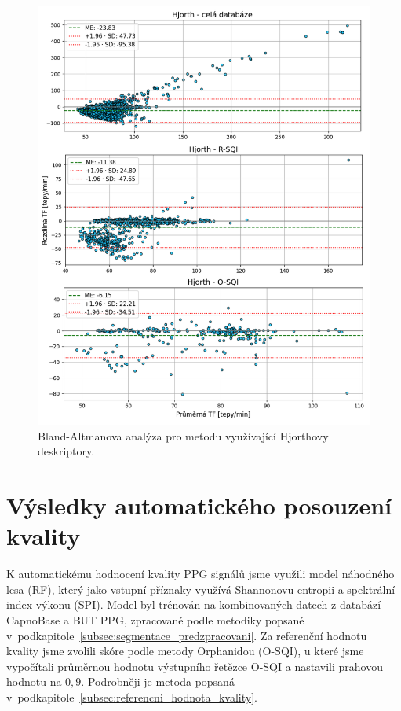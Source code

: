 \begin{figure}[!ht]
	\centering
	\includegraphics[width=1\textwidth]{./obrazky/vysledky/BA_BUT_Hjorth.png}
	\caption[Bland-Altmanova analýza pro metodu využívající Hjorthovy deskriptory - BUT PPG]{Bland-Altmanova analýza pro metodu využívající Hjorthovy deskriptory.}
	\label{fig:BUT_BlandAltman_hjorth}
\end{figure}

\FloatBarrier
\section{Výsledky automatického posouzení kvality}
\label{sec:vysledky_kvalita}
K automatickému hodnocení kvality \acs{PPG} signálů jsme využili model náhodného lesa (\acs{RF}), který jako vstupní příznaky využívá Shannonovu entropii a spektrální index výkonu (\acs{SPI}).
Model byl trénován na kombinovaných datech z databází CapnoBase a \acs{BUT PPG}, zpracované podle metodiky popsané v~podkapitole~\ref{subsec:segmentace_predzpracovani}.
Za referenční hodnotu kvality jsme zvolili skóre podle metody Orphanidou (\acs{O-SQI}), u které jsme vypočítali průměrnou hodnotu výstupního řetězce \acs{O-SQI} a nastavili prahovou hodnotu na $0,9$.
Podrobněji je metoda popsaná v~podkapitole~\ref{subsec:referencni_hodnota_kvality}.

